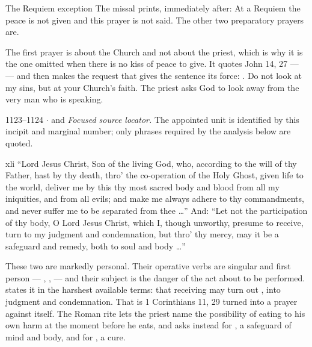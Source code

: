 \begin{rubricnote}{The Requiem exception}
The missal prints, immediately after:  At a Requiem the peace is not given and
this prayer is not said. The other two preparatory prayers are.
\end{rubricnote}

The first prayer is about the Church and not about the priest, which is why it
is the one omitted when there is no kiss of peace to give. It quotes John 14,
27 ---  --- and then makes
the request that gives the sentence its force: . Do not look at my sins, but at your Church's
faith. The priest asks God to look away from the very man who is speaking.

\begin{appointed}{1123--1124 $\cdot$  and }
\textit{Focused source locator.} The appointed unit is identified by this incipit and marginal number; only phrases required by the analysis below are quoted.
\end{appointed}

\begin{englishwitness}{xli}
``Lord Jesus Christ, Son of the living God, who, according to the will of thy
Father, hast by thy death, thro' the co-operation of the Holy Ghost, given life
to the world, deliver me by this thy most sacred body and blood from all my
iniquities, and from all evils; and make me always adhere to thy commandments,
and never suffer me to be separated from thee \dots'' And: ``Let not the
participation of thy body, O Lord Jesus Christ, which I, though unworthy,
presume to receive, turn to my judgment and condemnation, but thro' thy mercy,
may it be a safeguard and remedy, both to soul and body \dots''
\end{englishwitness}

These two are markedly personal. Their operative verbs are singular and first
person --- , ,
 --- and their subject is the danger of the act about to
be performed.  states it in the harshest available terms:
that receiving may turn out , into
judgment and condemnation. That is 1 Corinthians 11, 29 turned into a prayer
against itself. The Roman rite lets the priest name the possibility of eating
to his own harm at the moment before he eats, and asks instead for
, a safeguard of mind and body, and for
, a cure.

